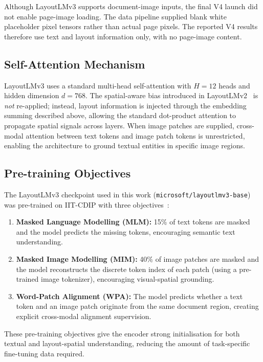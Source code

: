 Although LayoutLMv3 supports document-image inputs, the final V4 launch did not
enable page-image loading. The data pipeline supplied blank white placeholder
pixel tensors rather than actual page pixels. The reported V4 results therefore
use text and layout information only, with no page-image content.

\subsection{Self-Attention Mechanism}
\label{sec:self-attention}

LayoutLMv3 uses a standard multi-head self-attention with $H = 12$ heads and
hidden dimension $d = 768$. The spatial-aware bias introduced in
LayoutLMv2~\cite{xu2021layoutlmv2} is \emph{not} re-applied; instead, layout
information is injected through the embedding summing described above, allowing
the standard dot-product attention to propagate spatial signals across layers.
When image patches are supplied, cross-modal attention between text tokens and
image patch tokens is unrestricted, enabling the architecture to ground textual
entities in specific image regions.

\subsection{Pre-training Objectives}
\label{sec:pretraining-objectives}

The LayoutLMv3 checkpoint used in this work
(\texttt{microsoft/layoutlmv3-base}) was pre-trained on IIT-CDIP with three
objectives~\cite{huang2022layoutlmv3}:

\begin{enumerate}
  \item \textbf{Masked Language Modelling (MLM):} 15\% of text tokens are masked
  and the model predicts the missing tokens, encouraging semantic text understanding.
  \item \textbf{Masked Image Modelling (MIM):} 40\% of image patches are masked
  and the model reconstructs the discrete token index of each patch (using a
  pre-trained image tokenizer), encouraging visual-spatial grounding.
  \item \textbf{Word-Patch Alignment (WPA):} The model predicts whether a text
  token and an image patch originate from the same document region, creating
  explicit cross-modal alignment supervision.
\end{enumerate}

These pre-training objectives give the encoder strong initialisation for both
textual and layout-spatial understanding, reducing the amount of task-specific
fine-tuning data required.

